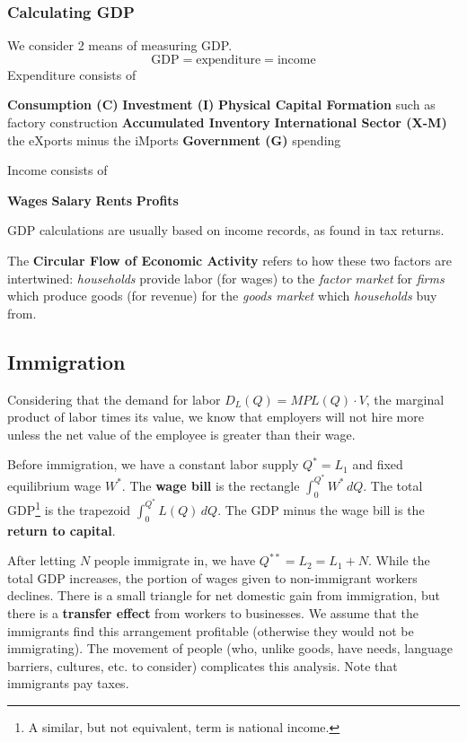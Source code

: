 \documentclass{article}
\def\termb #1{\1 \textbf{#1}}
\begin{document}
\subsubsection{Calculating GDP}
We consider 2 means of measuring GDP.
\[
    \textrm{GDP} = \textrm{expenditure} = \textrm{income}
\]
Expenditure consists of
\begin{outline}
	\termb{Consumption (C)}
	\termb{Investment (I)}
	\2 \textbf{Physical Capital Formation} such as factory construction
	\2 \textbf{Accumulated Inventory}
	\termb{International Sector (X-M)} the eXports minus the iMports
	\termb{Government (G)} spending
\end{outline}
Income consists of
\begin{outline}
	\termb{Wages}
	\termb{Salary}
	\termb{Rents}
	\termb{Profits}
\end{outline}
GDP calculations are usually based on income records, as found in tax returns.

The \textbf{Circular Flow of Economic Activity} refers to how these two factors are intertwined: \textit{households} provide labor (for wages) to the \textit{factor market} for \textit{firms} which produce goods (for revenue) for the \textit{goods market} which \textit{households} buy from.

\subsection{Immigration}
Considering that the demand for labor $D_L(Q) = MPL(Q)\cdot V$, the marginal product of labor times its value, we know that employers will not hire more unless the net value of the employee is greater than their wage.

Before immigration, we have a constant labor supply $Q^* = L_1$ and fixed equilibrium wage $W^*$. The \textbf{wage bill} is the rectangle $\int_0^{Q^*} W^*\,dQ$. The total GDP\footnote{A similar, but not equivalent, term is national income.} is the trapezoid  $\int_0^{Q^*} L(Q)\,dQ$. The GDP minus the wage bill is the \textbf{return to capital}.

After letting $N$ people immigrate in, we have $Q^{**} = L_2  = L_1 + N$. While the total GDP increases, the portion of wages given to non-immigrant workers declines. There is a small triangle for net domestic gain from immigration, but there is a \textbf{transfer effect} from workers to businesses. We assume that the immigrants find this arrangement profitable (otherwise they would not be immigrating). The movement of people (who, unlike goods, have needs, language barriers, cultures, etc. to consider) complicates this analysis. Note that immigrants pay taxes.
\end{document}
